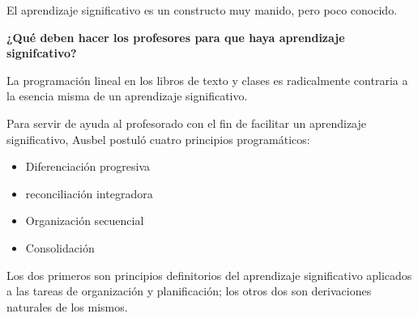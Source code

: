 \documentclass[12pt]{report}
\theoremstyle{largebreak}
\begin{document}
    El aprendizaje significativo es un constructo muy manido, pero poco conocido.

    \begin{center}
        \textbf{¿Qué deben hacer los profesores para que haya aprendizaje signifcativo?}
    \end{center}

    La programación lineal en los libros de texto y clases es radicalmente contraria a la esencia misma de un aprendizaje significativo.

    Para servir de ayuda al profesorado con el fin de facilitar un aprendizaje significativo, Ausbel postuló cuatro principios programáticos:
    \begin{itemize}
        \item Diferenciación progresiva
        \item reconciliación integradora
        \item Organización secuencial
        \item Consolidación
    \end{itemize}
    Los dos primeros son principios definitorios del aprendizaje significativo aplicados a las tareas de organización y planificación; los otros dos son derivaciones naturales de los
    mismos.
\end{document}
